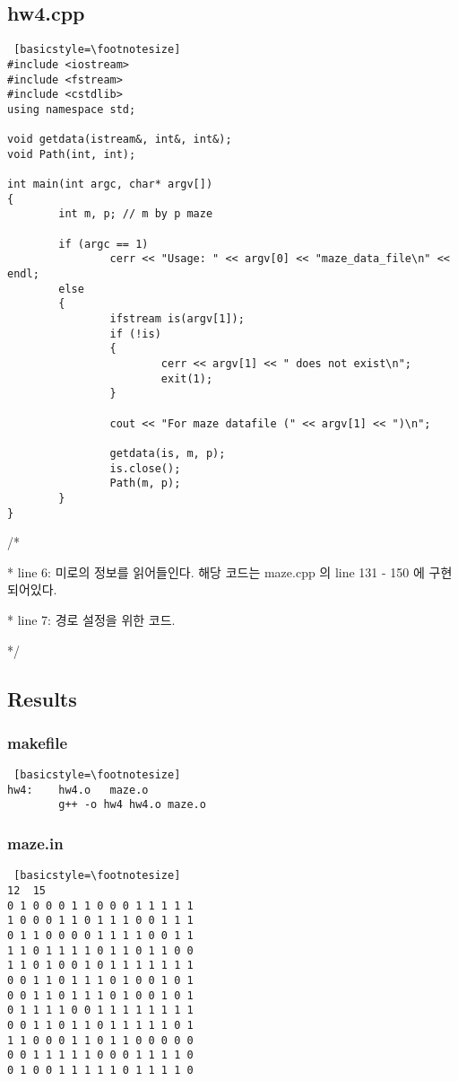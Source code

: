 \documentclass[twoside,twocolumn]{article}
\newenvironment{itemizeReduced}{
\begin{list}{\labelitemi}{\leftmargin=1em}
\setlength{\itemsep}{1pt}
\setlength{\parskip}{0pt}
\setlength{\parsep}{0pt}}{\end{list}
}
\begin{document}
\subsection{hw4.cpp}
\begin{lstlisting} [basicstyle=\footnotesize]
#include <iostream>
#include <fstream>
#include <cstdlib>
using namespace std;

void getdata(istream&, int&, int&);
void Path(int, int);

int main(int argc, char* argv[])
{
        int m, p; // m by p maze

        if (argc == 1)
                cerr << "Usage: " << argv[0] << "maze_data_file\n" << endl;
        else
        {
                ifstream is(argv[1]);
                if (!is)
                {
                        cerr << argv[1] << " does not exist\n";
                        exit(1);
                }

                cout << "For maze datafile (" << argv[1] << ")\n";

                getdata(is, m, p);
                is.close();
                Path(m, p);
        }
}
\end{lstlisting}
\begin{itemizeReduced}
    \item[/*] 
    \item[*] line 6: 미로의 정보를 읽어들인다. 해당 코드는 maze.cpp 의 line 131 - 150 에 구현되어있다.
    \item[*] line 7: 경로 설정을 위한 코드.
\end{itemizeReduced}
*/


\newpage

\subsection{Results}
\subsubsection{makefile}
\begin{lstlisting} [basicstyle=\footnotesize]
hw4:    hw4.o   maze.o
        g++ -o hw4 hw4.o maze.o
\end{lstlisting}

\subsubsection{maze.in}
\begin{lstlisting} [basicstyle=\footnotesize]
12  15
0 1 0 0 0 1 1 0 0 0 1 1 1 1 1
1 0 0 0 1 1 0 1 1 1 0 0 1 1 1
0 1 1 0 0 0 0 1 1 1 1 0 0 1 1
1 1 0 1 1 1 1 0 1 1 0 1 1 0 0
1 1 0 1 0 0 1 0 1 1 1 1 1 1 1
0 0 1 1 0 1 1 1 0 1 0 0 1 0 1
0 0 1 1 0 1 1 1 0 1 0 0 1 0 1
0 1 1 1 1 0 0 1 1 1 1 1 1 1 1
0 0 1 1 0 1 1 0 1 1 1 1 1 0 1
1 1 0 0 0 1 1 0 1 1 0 0 0 0 0
0 0 1 1 1 1 1 0 0 0 1 1 1 1 0
0 1 0 0 1 1 1 1 1 0 1 1 1 1 0
\end{lstlisting}
\end{document}

